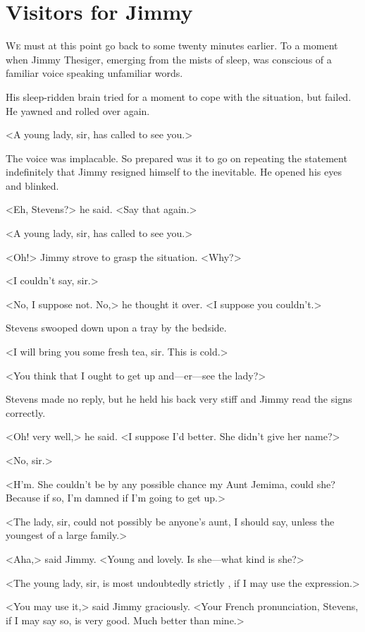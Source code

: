\chapter{Visitors for Jimmy}

\lettrine{W}{e} must at this point go back to some twenty minutes earlier. To a moment when Jimmy Thesiger, emerging from the mists of sleep, was conscious of a familiar voice speaking unfamiliar words.

\zz
His sleep-ridden brain tried for a moment to cope with the situation, but failed. He yawned and rolled over again.

<A young lady, sir, has called to see you.>

The voice was implacable. So prepared was it to go on repeating the statement indefinitely that Jimmy resigned himself to the inevitable. He opened his eyes and blinked.

<Eh, Stevens?> he said. <Say that again.>

<A young lady, sir, has called to see you.>

<Oh!> Jimmy strove to grasp the situation. <Why?>

<I couldn't say, sir.>

<No, I suppose not. No,> he thought it over. <I suppose you couldn't.>

Stevens swooped down upon a tray by the bedside.

<I will bring you some fresh tea, sir. This is cold.>

<You think that I ought to get up and—er—see the lady?>

Stevens made no reply, but he held his back very stiff and Jimmy read the signs correctly.

<Oh! very well,> he said. <I suppose I'd better. She didn't give her name?>

<No, sir.>

<H'm. She couldn't be by any possible chance my Aunt Jemima, could she? Because if so, I'm damned if I'm going to get up.>

<The lady, sir, could not possibly be anyone's aunt, I should say, unless the youngest of a large family.>

<Aha,> said Jimmy. <Young and lovely. Is she—what kind is she?>

<The young lady, sir, is most undoubtedly strictly , if I may use the expression.>

<You may use it,> said Jimmy graciously. <Your French pronunciation, Stevens, if I may say so, is very good. Much better than mine.>

